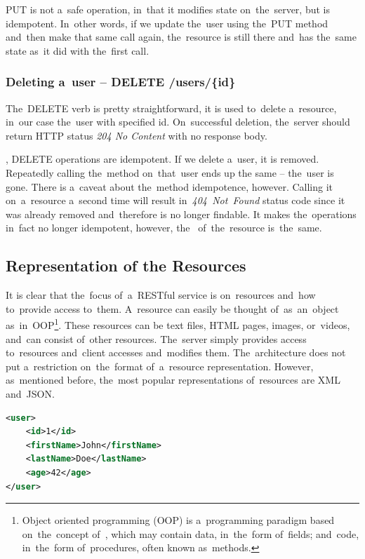 PUT is not a~safe operation, in~that it modifies state on~the~server, but is
idempotent. In~other words, if we update the~user using the~PUT method and~then
make that same call again, the~resource is still there and~has the~same state 
as~it did with the~first call.

\subsubsection{Deleting a~user -- DELETE /users/\{id\}}
The~DELETE verb is pretty straightforward, it is used to~delete a~resource,
in~our case the~user with specified id. On~successful deletion, the~server
should return HTTP status \textit{204 No Content} with no response body.

, DELETE operations are idempotent. If we delete a~user, it
is removed. Repeatedly calling the~method on~that~user ends up the same --
the~user is gone. There is a~caveat about the~method idempotence, however.
Calling it on~a~resource a~second time will result in~\textit{404~Not~Found}
status code since it was already removed and~therefore is no longer findable. It
makes the~operations in~fact no longer idempotent, however, the~
of~the~resource is~the~same.

\subsection{Representation of the Resources}
It is clear that the~focus of~a~RESTful service is on~resources and~how
to~provide access to~them. A~resource can easily be thought of~as~an~object
as~in~OOP\footnote{Object oriented programming (OOP) is a~programming paradigm
based on~the~concept of~, which may contain data, in~the~form
of~fields; and~code, in~the~form of~procedures, often known as~methods.}. These
resources can be text files, HTML pages, images, or~videos, and~can consist
of~other resources. The~server simply provides access to~resources
and~client accesses and~modifies them. The~architecture does not put
a~restriction on~the~format of~a~resource representation. However,
as~mentioned before, the~most popular representations of~resources are XML
and~JSON.

\vspace{2mm}
\begin{lstlisting}[caption=A XML representation of~a~\textit{user} resource.,
label=XMLExample, language=XML]
<user>
	<id>1</id>
	<firstName>John</firstName>
	<lastName>Doe</lastName>
	<age>42</age>
</user>
\end{lstlisting}

